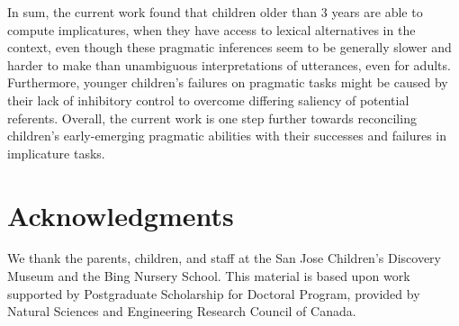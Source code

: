 \documentclass[10pt,letterpaper]{article}
\begin{document}
In sum, the current work found that children older than 3 years are able to compute implicatures, when they have access to lexical alternatives in the context, even though these pragmatic inferences seem to be generally slower and harder to make than unambiguous interpretations of utterances, even for adults. Furthermore, younger children's failures on pragmatic tasks might be caused by their lack of inhibitory control to overcome differing saliency of potential referents.
Overall, the current work is one step further towards reconciling children's early-emerging pragmatic abilities with their successes and failures in implicature tasks.

\section{Acknowledgments}

We thank the parents, children, and staff at the San Jose Children's Discovery Museum and the Bing Nursery School. This material is based upon work supported by Postgraduate Scholarship for Doctoral Program, provided by Natural Sciences and Engineering Research Council of Canada.




\setlength{\bibleftmargin}{.125in}
\setlength{\bibindent}{-\bibleftmargin}


\end{document}

